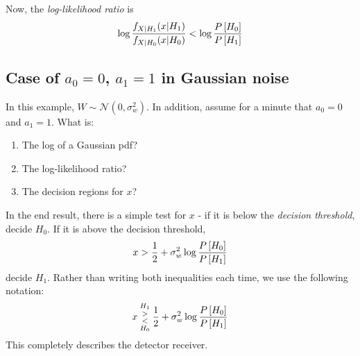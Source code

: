 Now, the \emph{log-likelihood ratio} is
\[
  \log \frac{f_{X|H_1}(x|H_1)}{f_{X|H_0}(x|H_0)}  < \log \frac{P\left[{H_0}\right]}{ P\left[{H_1}\right]}
\]

\subsection{Case of $a_0 = 0$, $a_1 = 1$ in Gaussian noise}

In this example, $W \sim \mathcal{N}(0,\sigma_w^2)$.  In addition,
assume for a minute that $a_0 = 0$ and $a_1 = 1$.  What is:
\begin{enumerate}
  \item The log of a Gaussian pdf?
  \item The log-likelihood ratio?
  \item The decision regions for $x$?
\end{enumerate}


In the end result, there is a simple test for $x$ - if it is below
the \emph{decision threshold}, decide $H_0$.  If it is above the
decision threshold,
\[
x  > \frac{1}{2} + \sigma_w^2 \log \frac{  P\left[{H_0}\right]}{ P\left[{H_1}\right]}
\]
decide $H_1$.  Rather than writing both inequalities each time, we
use the following notation:
\[
 x  {{H_1 \atop >} \atop {< \atop H_0}} \frac{1}{2} + \sigma_w^2 \log \frac{  P\left[{H_0}\right]}{P\left[{H_1}\right]}
\]
This completely describes the detector receiver.

